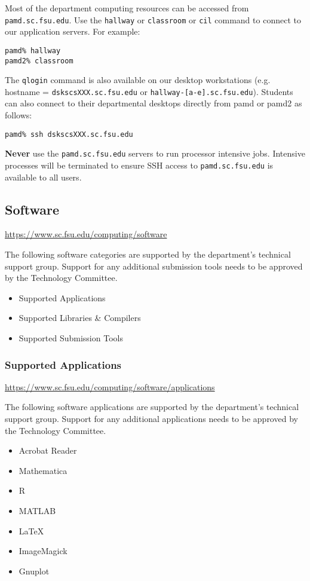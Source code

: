 \documentclass[12pt,a4paper]{article}
\begin{document}
Most of the department computing resources can be accessed from \texttt{pamd.sc.fsu.edu}. Use the \texttt{hallway} or \texttt{classroom} or \texttt{cil} command to connect to our application servers. For example:
\begin{verbatim}
pamd% hallway
pamd2% classroom
\end{verbatim}
The \texttt{qlogin} command is also available on our desktop workstations (e.g. hostname = \texttt{dskscsXXX.sc.fsu.edu} or \texttt{hallway-[a-e].sc.fsu.edu}). Students can also connect to their departmental desktops directly from pamd or pamd2 as follows:
\begin{verbatim}
pamd% ssh dskscsXXX.sc.fsu.edu
\end{verbatim}
\textbf{Never} use the \texttt{pamd.sc.fsu.edu} servers to run processor intensive jobs. Intensive processes will be terminated to ensure SSH access to \texttt{pamd.sc.fsu.edu} is available to all users.

\subsection{Software}
\url{https://www.sc.fsu.edu/computing/software}

The following software categories are supported by the department's technical support group. Support for any additional submission tools needs to be approved by the Technology Committee.
\begin{itemize}
    \item Supported Applications
    \item Supported Libraries \& Compilers
    \item Supported Submission Tools
\end{itemize}

\subsubsection{Supported Applications}
\url{https://www.sc.fsu.edu/computing/software/applications}

The following software applications are supported by the department's technical support group. Support for any additional applications needs to be approved by the Technology Committee.
\begin{itemize}
    \item Acrobat Reader
    \item Mathematica
    \item R
    \item MATLAB
    \item LaTeX
    \item ImageMagick
    \item Gnuplot
\end{itemize}
\end{document}

